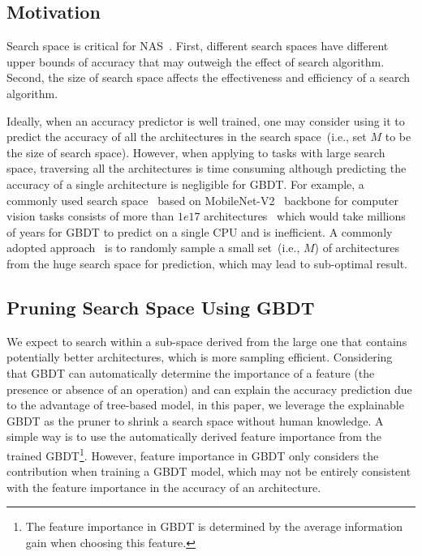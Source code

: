 \documentclass{article}
\begin{document}
\subsection{Motivation}
Search space is critical for NAS~\cite{random,rdarts}. First, different search spaces have different upper bounds of accuracy that may outweigh the effect of search algorithm. Second, the size of search space affects the effectiveness and efficiency of a search algorithm. 

Ideally, when an accuracy predictor is well trained, one may consider using it to predict the accuracy of all the architectures in the search space~(i.e., set $M$ to be the size of search space). However, when applying to tasks with large search space, traversing all the architectures is time consuming although predicting the accuracy of a single architecture is negligible for GBDT. For example, a commonly used search space~\cite{proxylessnas,neuralpredictor} based on MobileNet-V2~\cite{mobilenetv2} backbone for computer vision tasks consists of more than $1e17$ architectures~\cite{proxylessnas,mobilenetv3,onceforall} which would take millions of years for GBDT to predict on a single CPU and is inefficient. A commonly adopted approach~\cite{neuralpredictor,mctsnas} is to randomly sample a small set~(i.e., $M$) of architectures from the huge search space for prediction, which may lead to sub-optimal result.

\subsection{Pruning Search Space Using GBDT}
We expect to search within a sub-space derived from the large one that contains potentially better architectures, which is more sampling efficient. Considering that GBDT can automatically determine the importance of a feature (the presence or absence of an operation) and can explain the accuracy prediction due to the advantage of tree-based model, in this paper, we leverage the explainable GBDT as the pruner to shrink a search space without human knowledge. A simple way is to use the automatically derived feature importance from the trained GBDT\footnote{The feature importance in GBDT is determined by the average information gain when choosing this feature.}. However, feature importance in GBDT only considers the contribution when training a GBDT model, which may not be entirely consistent with the feature importance in the accuracy of an architecture.
\end{document}
